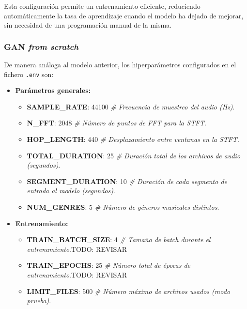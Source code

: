 \noindent Esta configuración permite un entrenamiento eficiente, reduciendo automáticamente la tasa de aprendizaje cuando el modelo ha dejado de mejorar, sin necesidad de una programación manual de la misma.


\subsubsection{GAN \emph{from scratch}}

De manera análoga al modelo anterior, los hiperparámetros configurados en el fichero \texttt{.env} son:

\begin{itemize}
  \item \textbf{Parámetros generales:}
  \begin{itemize}
    \item \textbf{SAMPLE\_RATE}: 44100 \emph{\# Frecuencia de muestreo del audio (Hz)}.
    \item \textbf{N\_FFT}: 2048 \emph{\# Número de puntos de FFT para la STFT}.
    \item \textbf{HOP\_LENGTH}: 440 \emph{\# Desplazamiento entre ventanas en la STFT}.
    \item \textbf{TOTAL\_DURATION}: 25 \emph{\# Duración total de los archivos de audio (segundos)}.
    \item \textbf{SEGMENT\_DURATION}: 10 \emph{\# Duración de cada segmento de entrada al modelo (segundos)}.
    \item \textbf{NUM\_GENRES}: 5 \emph{\# Número de géneros musicales distintos}.
  \end{itemize}

  \item \textbf{Entrenamiento:}
  \begin{itemize}
    \item \textbf{TRAIN\_BATCH\_SIZE}: 4 \emph{\# Tamaño de batch durante el entrenamiento}.TODO: REVISAR
    \item \textbf{TRAIN\_EPOCHS}: 25 \emph{\# Número total de épocas de entrenamiento}.TODO: REVISAR
    \item \textbf{LIMIT\_FILES}: 500 \emph{\# Número máximo de archivos usados (modo prueba)}.
  \end{itemize}


\end{itemize}
